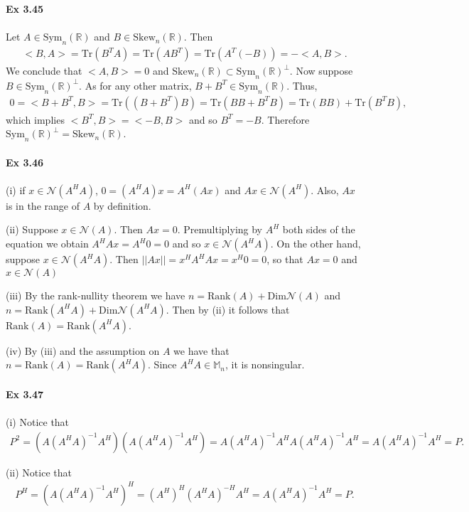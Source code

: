 \documentclass[letterpaper,12pt]{article}
\theoremstyle{definition}
\begin{document}
\begin{spacing}{1.3}{}
	\textbf{Ex 3.45} \\\\
	Let $A\in\text{Sym}_n(\mathbb R)$ and $B\in\text{Skew}_n(\mathbb R)$.
	Then
	\begin{align*}
	<B,A>=\text{Tr}(B^TA)=\text{Tr}(AB^T)=
	\text{Tr}(A^T(-B))=-<A,B>.
	\end{align*}
	We conclude that $<A,B>=0$ and $\text{Skew}_n(\mathbb R)\subset\text{Sym}_n(\mathbb R)^\perp$.
	Now suppose $B\in\text{Sym}_n(\mathbb R)^\perp$.
	As for any other matrix, $B+B^T\in\text{Sym}_n(\mathbb R)$.
	Thus,
	\begin{align*}
	0 = <B+B^T,B>=\text{Tr}((B+B^T)B) =\text{Tr}(BB + B^TB)=
	\text{Tr}(BB)+\text{Tr}(B^TB),
	\end{align*}
	which implies $<B^T,B>=<-B,B>$ and so $B^T=-B$.
	Therefore $\text{Sym}_n(\mathbb R)^\perp=\text{Skew}_n(\mathbb R)$. \\\\
	
	\textbf{Ex 3.46} \\\\
	(i)
	if $x\in\mathcal N(A^HA)$, $0=(A^HA)x=A^H(Ax)$ and $Ax\in\mathcal N(A^H)$.
	Also, $Ax$ is in the range of $A$ by definition.
	
	(ii)
	Suppose $x\in\mathcal N(A)$.
	Then $Ax=0$.
	Premultiplying by $A^H$ both sides of the equation we obtain $A^HAx=A^H0=0$
	and so $x\in\mathcal N(A^HA)$.
	On the other hand, suppose $x\in\mathcal N(A^HA)$.
	Then $||Ax||=x^HA^HAx=x^H0=0$, so that $Ax=0$ and $x\in\mathcal N(A)$
	
	(iii)
	By the rank-nullity theorem we have $n=\text{Rank}(A)+\text{Dim}\mathcal N(A)$
	and $n=\text{Rank}(A^HA)+\text{Dim}\mathcal N(A^HA)$.
	Then by (ii) it follows that $\text{Rank}(A)=\text{Rank}(A^HA)$.
	
	(iv)
	By (iii) and the assumption on $A$ we have that $n=\text{Rank}(A)=\text{Rank}(A^HA)$.
	Since $A^HA\in\mathbb M_n$, it is nonsingular.\\\\
	
	\textbf{Ex 3.47} \\\\
	(i)
	Notice that
	\begin{align*}
	P^2=(A(A^HA)^{-1}A^H)(A(A^HA)^{-1}A^H)=
	A(A^HA)^{-1}A^HA(A^HA)^{-1}A^H=
	A(A^HA)^{-1}A^H=P.
	\end{align*}
	
	(ii)
	Notice that
	\begin{align*}
	P^H=(A(A^HA)^{-1}A^H)^H=
	(A^H)^H(A^HA)^{-H}A^H=A(A^HA)^{-1}A^H=P.
	\end{align*}
	

\end{spacing}
\end{document}
